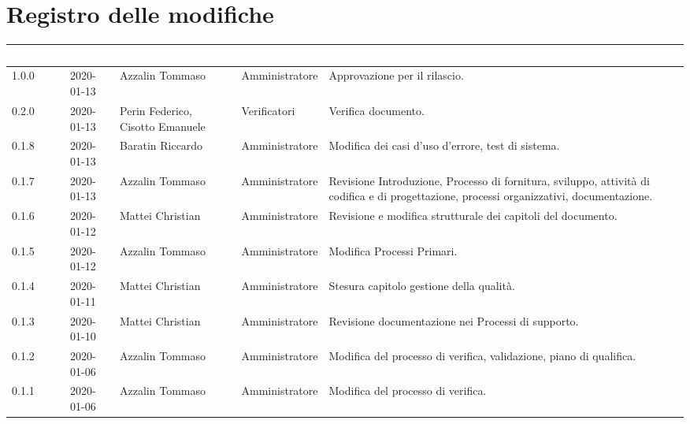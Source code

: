 \section*{Registro delle modifiche}
{
\renewcommand{\arraystretch}{1.5}
\centering
\begin{longtable}{C{2cm} C{2cm}  C{3cm}  C{3cm} C{4.5cm}}
\textcolor{white}{\textbf{Versione}} & \textcolor{white}{\textbf{Data}} & \textcolor{white}{\textbf{Nominativo}} & \textcolor{white}{\textbf{Ruolo}} & \textcolor{white}{\textbf{Descrizione}}\\	
\endhead

1.0.0 & 2020-01-13 & Azzalin Tommaso & Amministratore & Approvazione per il rilascio.  \\

0.2.0 & 2020-01-13 & Perin Federico, Cisotto Emanuele & Verificatori & Verifica documento.  \\ 

0.1.8 & 2020-01-13 & Baratin Riccardo & Amministratore & Modifica dei casi d'uso d'errore, test di sistema. \\

0.1.7 & 2020-01-13 & Azzalin Tommaso & Amministratore & Revisione Introduzione, Processo di fornitura, sviluppo, attività di codifica e di progettazione, processi organizzativi, documentazione. \\

0.1.6 & 2020-01-12 & Mattei Christian & Amministratore & Revisione e modifica strutturale dei capitoli del documento. \\

0.1.5 & 2020-01-12 & Azzalin Tommaso & Amministratore & Modifica Processi Primari. \\

0.1.4 & 2020-01-11 & Mattei Christian & Amministratore & Stesura capitolo gestione della qualità. \\

0.1.3 & 2020-01-10 & Mattei Christian & Amministratore & Revisione documentazione nei Processi di supporto. \\

0.1.2 & 2020-01-06 & Azzalin Tommaso & Amministratore & Modifica del processo di verifica, validazione, piano di qualifica. \\

0.1.1 & 2020-01-06 & Azzalin Tommaso & Amministratore & Modifica del processo di verifica. \\


\end{longtable}}
